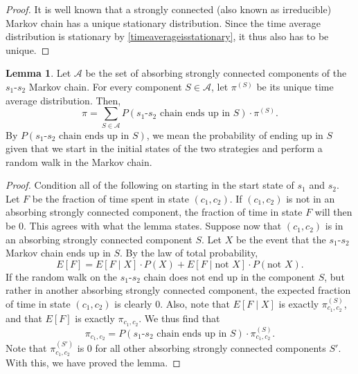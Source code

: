 \documentclass[12pt]{article}
\theoremstyle{definition}
\newtheorem{lemma}[theorem]{Lemma}
\theoremstyle{remark}
\begin{document}
\begin{proof}
  It is well known that a strongly connected (also known as irreducible) Markov chain has a unique stationary distribution. Since the time average distribution is stationary by \cref{timeaverageisstationary}, it thus also has to be unique.
\end{proof}

\begin{lemma}
  \label{timeaveragedistributiondecomposition}
  Let $\mathcal{A}$ be the set of absorbing strongly connected components of the $s_1$-$s_2$ Markov chain. For every component $S \in \mathcal{A}$, let $\pi^{(S)}$ be its unique time average distribution. Then,
  \begin{equation*}
    \pi = \sum_{S \in \mathcal{A}} P(\text{$s_1$-$s_2$ chain ends up in $S$}) \cdot \pi^{(S)}.
  \end{equation*}
  By $P(s_1\text{-}s_2 \text{ chain ends up in } S)$, we mean the probability of ending up in $S$ given that we start in the initial states of the two strategies and perform a random walk in the Markov chain.
\end{lemma}

\begin{proof}
  Condition all of the following on starting in the start state of $s_1$ and $s_2$. Let $F$ be the fraction of time spent in state $(c_1,c_2)$. If $(c_1,c_2)$ is not in an absorbing strongly connected component, the fraction of time in state $F$ will then be 0. This agrees with what the lemma states. Suppose now that $(c_1,c_2)$ is in an absorbing strongly connected component $S$.
  Let $X$ be the event that the $s_1$-$s_2$ Markov chain ends up in $S$. By the law of total probability, \begin{equation*}
    E[F] = E[F \mid X] \cdot P(X) + E[F \mid \text{not } X] \cdot P(\text{not } X).
  \end{equation*}
   If the random walk on the $s_1$-$s_2$ chain does not end up in the component $S$, but rather in another absorbing strongly connected component, the expected fraction of time in state $(c_1,c_2)$ is clearly 0. Also, note that $E[F \mid X]$ is exactly $\pi^{(S)}_{c_1,c_2}$, and that $E[F]$ is exactly $\pi_{c_1,c_2}$. We thus find that \begin{equation*}
     \pi_{c_1,c_2} = P(\text{$s_1$-$s_2$ chain ends up in $S$}) \cdot \pi^{(S)}_{c_1,c_2}.
   \end{equation*}
   Note that $\pi^{(S')}_{c_1,c_2}$ is 0 for all other absorbing strongly connected components $S'$. With this, we have proved the lemma.
\end{proof}
\end{document}
